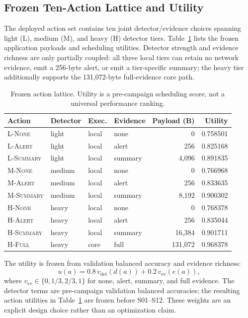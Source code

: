 \documentclass[10pt,journal]{IEEEtran}
\newcommand{\Lnone}{\textsc{L-None}}
\newcommand{\Lalert}{\textsc{L-Alert}}
\newcommand{\Lsummary}{\textsc{L-Summary}}
\newcommand{\Mnone}{\textsc{M-None}}
\newcommand{\Malert}{\textsc{M-Alert}}
\newcommand{\Msummary}{\textsc{M-Summary}}
\newcommand{\Hnone}{\textsc{H-None}}
\newcommand{\Halert}{\textsc{H-Alert}}
\newcommand{\Hsummary}{\textsc{H-Summary}}
\newcommand{\Hfull}{\textsc{H-Full}}
\begin{document}
\subsection{Frozen Ten-Action Lattice and Utility}
The deployed action set contains ten joint detector/evidence choices spanning light (L), medium (M), and heavy (H) detector tiers. Table~\ref{tab:actions} lists the frozen application payloads and scheduling utilities. Detector strength and evidence richness are only partially coupled: all three local tiers can retain no network evidence, emit a 256-byte alert, or emit a tier-specific summary; the heavy tier additionally supports the 131,072-byte full-evidence core path.

\begin{table}[t]
\centering
\caption{Frozen action lattice. Utility is a pre-campaign scheduling score, not a universal performance ranking.}
\label{tab:actions}
\scriptsize
\setlength{\tabcolsep}{3.0pt}
\begin{tabular}{@{}llllrr@{}}
\toprule
Action & Detector & Exec. & Evidence & Payload (B) & Utility\\
\midrule
\Lnone{}    & light  & local & none    & 0       & 0.758501\\
\Lalert{}   & light  & local & alert   & 256     & 0.825168\\
\Lsummary{} & light  & local & summary & 4,096   & 0.891835\\
\Mnone{}    & medium & local & none    & 0       & 0.766968\\
\Malert{}   & medium & local & alert   & 256     & 0.833635\\
\Msummary{} & medium & local & summary & 8,192   & 0.900302\\
\Hnone{}    & heavy  & local & none    & 0       & 0.768378\\
\Halert{}   & heavy  & local & alert   & 256     & 0.835044\\
\Hsummary{} & heavy  & local & summary & 16,384  & 0.901711\\
\Hfull{}    & heavy  & core  & full    & 131,072 & 0.968378\\
\bottomrule
\end{tabular}
\end{table}

The utility is frozen from validation balanced accuracy and evidence richness:
\begin{equation}
  u(a)=0.8\,v_{\mathrm{det}}(d(a))+0.2\,v_{\mathrm{ev}}(e(a)),
  \label{eq:utility}
\end{equation}
where $v_{\mathrm{ev}}\in\{0,1/3,2/3,1\}$ for none, alert, summary, and full evidence. The detector terms are pre-campaign validation balanced accuracies; the resulting action utilities in Table~\ref{tab:actions} are frozen before S01--S12. These weights are an explicit design choice rather than an optimization claim.
\end{document}
